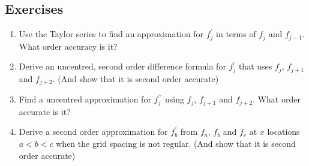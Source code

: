 {{}}\clearpage{}

\clearpage{}

\subsection{Exercises}
\begin{enumerate}
\item Use the Taylor series to find an approximation for $f_{j}^{\prime}$
in terms of $f_{j}$ and $f_{j-1}$. What order accuracy is it?\vfill{}
\item Derive an uncentred, second order difference formula for $f_{j}^{\prime}$
that uses $f_{j}$, $f_{j+1}$ and $f_{j+2}$. (And show that it is
second order accurate) \vfill{}
\item Find a uncentred approximation for $f_{j}^{\prime\prime}$ using $f_{j}$,
$f_{j+1}$ and $f_{j+2}$. What order accurate is it? 
\item Derive a second order approximation for $f_{b}^{\prime}$ from $f_{a}$,
$f_{b}$ and $f_{c}$ at $x$ locations $a<b<c$ when the grid spacing
is not regular. (And show that it is second order accurate) 
\end{enumerate}
\clearpage{}

